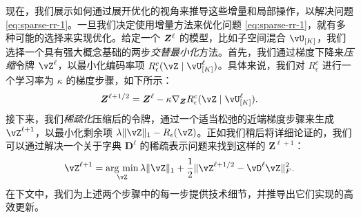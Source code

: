 \documentclass[../../book-main.tex]{subfiles}
\begin{document}
现在，我们展示如何通过展开优化的视角来推导这些增量和局部操作，以解决问题 \eqref{eq:sparse-rr-1}。一旦我们决定使用增量方法来优化问题 \eqref{eq:sparse-rr-1}，就有多种可能的选择来实现优化。给定一个 $\bm{Z}^\ell$ 的模型，比如子空间混合 $\vU_{[K]}$，我们选择一个具有强大概念基础的两步\textit{交替最小化}方法。首先，我们通过梯度下降来\textit{压缩}令牌 $\vZ^{\ell}$，以最小化编码率项 $R^c_\epsilon (\vZ \mid \vU_{[K]}^\ell)$。具体来说，我们对 $R^c_\epsilon$ 进行一个学习率为 $\kappa$ 的梯度步骤，如下所示：
\begin{align}\label{eq:Z l+1/2}
    \bm Z^{\ell+1/2} = \bm Z^\ell - \kappa \nabla_{\bm Z} R^c_\epsilon (\vZ \mid \vU_{[K]}^\ell).
\end{align}
接下来，我们\textit{稀疏化}压缩后的令牌，通过一个适当松弛的近端梯度步骤来生成 \(\vZ^{\ell + 1}\)，以最小化剩余项 $\lambda \norm{\vZ}_{1} - R_{\epsilon}(\vZ)$。正如我们稍后将详细论证的，我们可以通过解决一个关于字典 $\bm D^\ell$ 的稀疏表示问题来找到这样的 $\bm Z^{\ell+1}$：
\begin{equation}\label{eq:Z l+1}
  \vZ^{\ell+1} = \argmin_{{\vZ}}  \lambda \norm{\vZ}_1 + \frac{1}{2}\norm{\vZ^{\ell + 1/2} - \vD^{\ell} {\vZ}}_F^2.
\end{equation}
在下文中，我们为上述两个步骤中的每一步提供技术细节，并推导出它们实现的高效更新。
\end{document}
